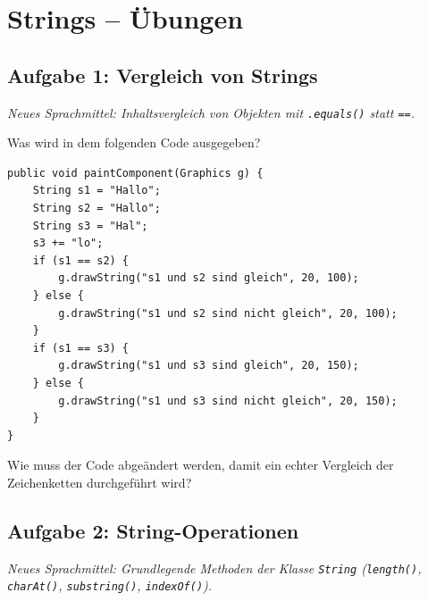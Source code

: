 \clearpage

\rehead[]{\textcolor{lightblue}{AvHG, Inf, My}}
\lohead[]{\textcolor{lightblue}{AvHG, Inf, My}}

\section{Strings -- Übungen}

\subsection{Aufgabe 1: Vergleich von Strings \tagPflicht}
\noindent \emph{Neues Sprachmittel: Inhaltsvergleich von Objekten mit \texttt{.equals()} statt \texttt{==}.}

\begin{compactenum}[a)]
\item Was wird in dem folgenden Code ausgegeben?

\begin{lstlisting}
public void paintComponent(Graphics g) {
    String s1 = "Hallo";
    String s2 = "Hallo";
    String s3 = "Hal";
    s3 += "lo";
    if (s1 == s2) {
        g.drawString("s1 und s2 sind gleich", 20, 100);
    } else {
        g.drawString("s1 und s2 sind nicht gleich", 20, 100);
    }
    if (s1 == s3) {
        g.drawString("s1 und s3 sind gleich", 20, 150);
    } else {
        g.drawString("s1 und s3 sind nicht gleich", 20, 150);
    }
}
\end{lstlisting}

\item Wie muss der Code abgeändert werden, damit ein echter Vergleich der
Zeichenketten durchgeführt wird?
\end{compactenum}


\subsection{Aufgabe 2: String-Operationen \tagPflicht}
\noindent \emph{Neues Sprachmittel: Grundlegende Methoden der Klasse \texttt{String} (\texttt{length()}, \texttt{charAt()}, \texttt{substring()}, \texttt{indexOf()}).}

